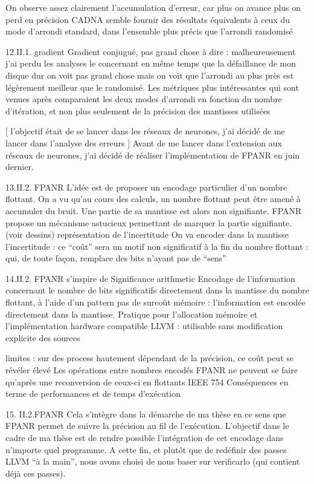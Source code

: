 \documentclass[a4paper,11pt]{report}
\begin{document}
On observe assez clairement l’accumulation d’erreur, car plus on avance plus on perd en précision 
CADNA semble fournir des résultats équivalents à ceux du mode d’arrondi standard, dans l’ensemble plus précis que l’arrondi randomisé

12.II.1. gradient
Gradient conjugué, pas grand chose à dire : malheureusement j’ai perdu les analyses le concernant en même temps que la défaillance de mon disque dur
on voit pas grand chose mais on voit que l’arrondi au plus près est légèrement meilleur que le randomisé.
Les métriques plus intéressantes qui sont venues après comparaient les deux modes d’arrondi en fonction du nombre d’itération, et non plus seulement de la précision des mantisses utilisées

[ l’objectif était de se lancer dans les réseaux de neurones, j’ai décidé de me lancer dans l’analyse des erreurs ]
Avant de me lancer dans l’extension aux réseaux de neurones, j’ai décidé de réaliser l’implémentation de FPANR en juin dernier.

13.II.2. FPANR
L’idée est de proposer un encodage particulier d’un nombre flottant.
On a vu qu’au cours des calculs, un nombre flottant peut être amené à accumuler du bruit. Une partie de sa mantisse est alors non signifiante.
FPANR propose un mécanisme astucieux permettant de marquer la partie signifiante. (voir dessins) représentation de l’incertitude
On va encoder dans la mantisse l’incertitude : ce “coût” sera un motif non significatif à la fin du nombre flottant : qui, de toute façon, remplace des bits n’ayant pas de “sens”

14.II.2. FPANR
s’inspire de Significance arithmetic
Encodage de l’information concernant  le nombre de bits significatifs directement dans la mantisse du nombre flottant, à l’aide d’un pattern
pas de surcoût mémoire : l’information est encodée directement dans la mantisse. Pratique pour l’allocation mémoire et l’implémentation hardware
compatible 
LLVM : utilisable sans modification explicite des sources

limites : sur des process hautement dépendant de la précision, ce coût peut se révéler élevé
Les opérations entre nombres encodés FPANR ne peuvent se faire qu’après une reconversion de ceux-ci en flottants IEEE 754
Conséquences en terme de performances et de temps d’exécution


15. II.2.FPANR
Cela s’intègre dans la démarche de ma thèse en ce sens que FPANR permet de suivre la précision au fil de l’exécution.
L’objectif dans le cadre de ma thèse est de rendre possible l’intégration de cet encodage dans n’importe quel programme.
A cette fin, et plutôt que de redéfinir des passes LLVM “à la main”, nous avons choisi de nous baser sur verificarlo (qui contient déjà ces passes).
\end{document}
